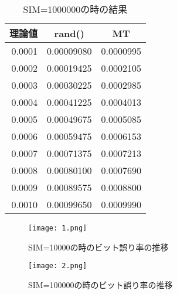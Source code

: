 \documentclass[12pt]{jarticle}
\begin{document}
\begin{table}[h]
    \begin{minipage}{0.5\hsize}
        \begin{center}
            \caption{SIM=1000000の時の結果}
            \begin{tabular}{|r|r|r|} \hline
                \multicolumn{1}{|c|}{理論値} & \multicolumn{1}{|c|}{rand()} & \multicolumn{1}{|c|}{MT} \\\hline
                0.0001                       & 0.00009080                   & 0.0000995                \\\hline
                0.0002                       & 0.00019425                   & 0.0002105                \\\hline
                0.0003                       & 0.00030225                   & 0.0002985                \\\hline
                0.0004                       & 0.00041225                   & 0.0004013                \\\hline
                0.0005                       & 0.00049675                   & 0.0005085                \\\hline
                0.0006                       & 0.00059475                   & 0.0006153                \\\hline
                0.0007                       & 0.00071375                   & 0.0007213                \\\hline
                0.0008                       & 0.00080100                   & 0.0007690                \\\hline
                0.0009                       & 0.00089575                   & 0.0008800                \\\hline
                0.0010                       & 0.00099650                   & 0.0009990                \\\hline
            \end{tabular}
        \end{center}
    \end{minipage}
\end{table}
\begin{figure}[H]
    \begin{center}
        \texttt{[image: 1.png]}
    \end{center}
    \caption{SIM=10000の時のビット誤り率の推移}
    \label{fig1}
\end{figure}
\begin{figure}[H]
    \begin{center}
        \texttt{[image: 2.png]}
    \end{center}
    \caption{SIM=100000の時のビット誤り率の推移}
    \label{fig1}
\end{figure}
\end{document}
